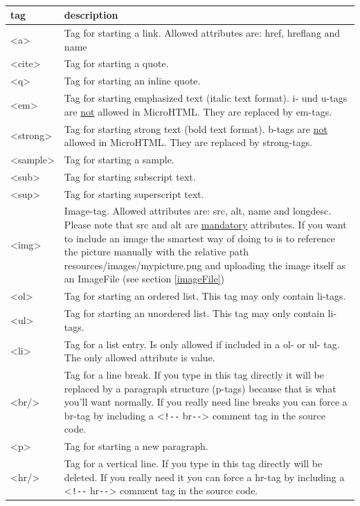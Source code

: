 \documentclass[a4paper,10pt]{book}
\newcommand{\htmlTag}[1]{\textless #1\textgreater}
\newcommand{\xhtmlComment}[1]{\textless\verb+!--+ #1\verb+--+\textgreater}
\begin{document}
\paragraph{}
\begin{tabularx}{\textwidth}{lX}
\hline
\textbf{tag} & \textbf{description}\\
\hline
\htmlTag{a}& Tag for starting a link. Allowed attributes are: href, hreflang and name\\ [0.1cm]
\hline
\htmlTag{cite} & Tag for starting a quote.\\ [0.1cm]
\hline
\htmlTag{q} & Tag for starting an inline quote.\\ [0.1cm]
\hline
\htmlTag{em} & Tag for starting emphasized text (italic text format). i- und u-tags are \underline{not} allowed in MicroHTML. They are replaced by em-tags.\\ [0.1cm]
\hline
\htmlTag{strong} & Tag for starting strong text (bold text format). b-tags are \underline{not} allowed in MicroHTML. They are replaced by strong-tags.\\ [0.1cm]
\hline
\htmlTag{sample} & Tag for starting a sample.\\ [0.1cm]
\hline
\htmlTag{sub} & Tag for starting subscript text.\\ [0.1cm]
\hline
\htmlTag{sup} & Tag for starting superscript text.\\ [0.1cm]
\hline
\htmlTag{img} & Image-tag. Allowed attributes are: src, alt, name and longdesc. Please note that src and alt are \underline{mandatory} attributes. If you want to include an image the smartest way of doing to is to reference the picture manually with the relative path resources/images/mypicture.png and uploading the image itself as an ImageFile (see section \ref{imageFile})\\ [0.1cm]
\hline
\htmlTag{ol} & Tag for starting an ordered list. This tag may only contain li-tags.\\ [0.1cm]
\hline
\htmlTag{ul} & Tag for starting an unordered list. This tag may only contain li-tags.\\ [0.1cm]
\hline
\htmlTag{li} & Tag for a list entry. Is only allowed if included in a ol- or ul- tag. The only allowed attribute is value.\\ [0.1cm]
\hline
\htmlTag{br/} & Tag for a line break. If you type in this tag directly it will be replaced by a paragraph structure (p-tags) because that is what you'll want normally. If you really need line breaks you can force a br-tag by including a \xhtmlComment{br} comment tag in the source code.\\ [0.1cm]
\hline
\htmlTag{p} & Tag for starting a new paragraph.\\ [0.1cm]
\hline
\htmlTag{hr/} & Tag for a vertical line. If you type in this tag directly will be deleted. If you really need it you can force a hr-tag by including a \xhtmlComment{hr} comment tag in the source code.\\ [0.1cm]
\end{tabularx}
\end{document}
